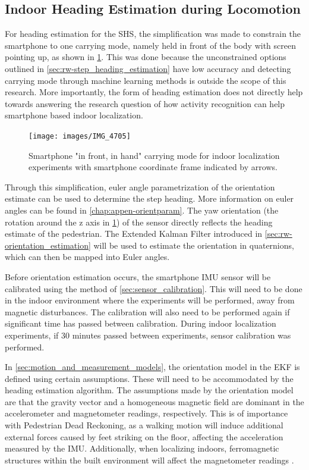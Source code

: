\newpage
\subsection{Indoor Heading Estimation during Locomotion}
\label{sec:meth-indoor_heading_estimation}
For heading estimation for the \ac{SHS}, the simplification was made to constrain the smartphone to one carrying mode, namely held in front of the body with screen pointing up, as shown in \cref{fig:experiment_carrying_position}. This was done because the unconstrained options outlined in \cref{sec:rw-step_heading_estimation} have low accuracy and detecting carrying mode through machine learning methods is outside the scope of this research. More importantly, the form of heading estimation does not directly help towards answering the research question of how activity recognition can help smartphone based indoor localization. \par 
\begin{figure}[H]
	\centering
	\texttt{[image: images/IMG\_4705]}
	\caption{Smartphone "in front, in hand" carrying mode for indoor localization experiments with smartphone coordinate frame indicated by arrows.}
	\label{fig:experiment_carrying_position}
\end{figure}
Through this simplification, euler angle parametrization of the orientation estimate can be used to determine the step heading. More information on euler angles can be found in \cref{chap:appen-orientparam}. The yaw orientation (the rotation around the z axis in \cref{fig:experiment_carrying_position}) of the sensor directly reflects the heading estimate of the pedestrian. The Extended Kalman Filter introduced in \cref{sec:rw-orientation_estimation} will be used to estimate the orientation in quaternions, which can then be mapped into Euler angles. \par 

Before orientation estimation occurs, the smartphone \ac{IMU} sensor will be calibrated using the method of \cref{sec:sensor_calibration}. This will need to be done in the indoor environment where the experiments will be performed, away from magnetic disturbances. The calibration will also need to be performed again if significant time has passed between calibration. During indoor localization experiments, if 30 minutes passed between experiments, sensor calibration was performed.\par 

In \cref{sec:motion_and_measurement_models}, the orientation model in the EKF is defined using certain assumptions. These will need to be accommodated by the heading estimation algorithm.
The assumptions made by the orientation model  are that the gravity vector and a homogeneous magnetic field are dominant in the accelerometer and magnetometer readings, respectively. This is of importance with Pedestrian Dead Reckoning, as a walking motion will induce additional external forces caused by feet striking on the floor, affecting the acceleration measured by the IMU. Additionally, when localizing indoors, ferromagnetic structures within the built environment will affect the magnetometer readings \cite{Michel2015a}.\par 

